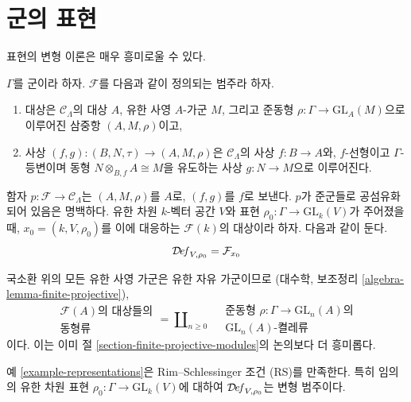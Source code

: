 \section{군의 표현}
\label{section-representations}

\noindent
표현의 변형 이론은 매우 흥미로울 수 있다.

\begin{example}[군의 표현]
\label{example-representations}
$\Gamma$를 군이라 하자. $\mathcal{F}$를 다음과 같이 정의되는 범주라 하자.
\begin{enumerate}
\item 대상은 $\mathcal{C}_\Lambda$의 대상 $A$, 유한 사영 $A$-가군 $M$,
그리고 준동형 $\rho : \Gamma \to \text{GL}_A(M)$으로 이루어진 삼중항
$(A, M, \rho)$이고,
\item 사상 $(f, g) : (B, N, \tau) \to (A, M, \rho)$은
$\mathcal{C}_\Lambda$의 사상 $f : B \to A$와, $f$-선형이고
$\Gamma$-등변이며 동형 $N \otimes_{B, f} A \cong M$을 유도하는 사상
$g : N \to M$으로 이루어진다.
\end{enumerate}
함자 $p : \mathcal{F} \to \mathcal{C}_\Lambda$는 $(A, M, \rho)$를 $A$로,
$(f, g)$를 $f$로 보낸다. $p$가 준군들로 공섬유화되어 있음은 명백하다.
유한 차원 $k$-벡터 공간 $V$와 표현
$\rho_0 : \Gamma \to \text{GL}_k(V)$가 주어졌을 때,
$x_0 = (k, V, \rho_0)$를 이에 대응하는 $\mathcal{F}(k)$의 대상이라 하자.
다음과 같이 둔다.
$$
\mathcal{D}\!\mathit{ef}_{V, \rho_0} = \mathcal{F}_{x_0}
$$
\end{example}

\noindent
국소환 위의 모든 유한 사영 가군은 유한 자유 가군이므로
(대수학, 보조정리 \ref{algebra-lemma-finite-projective}),
$$
\begin{matrix}
\mathcal{F}(A)\text{의 대상들의} \\
\text{동형류}
\end{matrix}
=
\coprod\nolimits_{n \geq 0}\quad
\begin{matrix}
\text{준동형 }\rho : \Gamma \to \text{GL}_n(A)\text{의}\\
\text{GL}_n(A)\text{-켤레류}
\end{matrix}
$$
이다. 이는 이미 절 \ref{section-finite-projective-modules}의 논의보다
더 흥미롭다.

\begin{lemma}
\label{lemma-representations-RS}
예 \ref{example-representations}은 Rim--Schlessinger 조건 (RS)를
만족한다. 특히 임의의 유한 차원 표현
$\rho_0 : \Gamma \to \text{GL}_k(V)$에 대하여
$\mathcal{D}\!\mathit{ef}_{V, \rho_0}$는 변형 범주이다.
\end{lemma}

